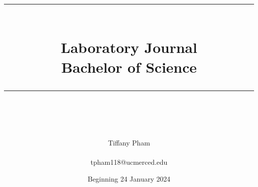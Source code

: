 \documentclass[idxtotoc,hyperref,openany]{labbook} %
\newcommand{\HRule}{\rule{\linewidth}{0.5mm}} %
\begin{document}

\frontmatter %
\title{
\begin{center}
\HRule \\[0.4cm]
{\Huge \bfseries Laboratory Journal \\[0.5cm] \Large Bachelor of Science}\\[0.4cm] %
\HRule \\[1.5cm]
\end{center}
}
\author{\Huge Tiffany Pham \\ \\ \LARGE tpham118@ucmerced.edu \\[2cm]} %
\date{Beginning 24 January 2024} %
\maketitle

\tableofcontents

\mainmatter %










\end{document}
